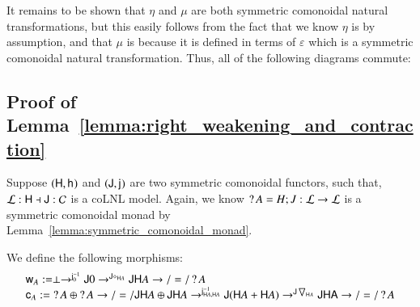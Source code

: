 It remains to be shown that $\eta$ and $\mu$ are both
symmetric comonoidal natural transformations, but this easily follows
from the fact that we know $\eta$ is by assumption, and that $\mu$
is because it is defined in terms of $\varepsilon$ which is a
symmetric comonoidal natural transformation.  Thus, all of the
following diagrams commute:

\subsection{Proof of Lemma~\ref{lemma:right_weakening_and_contraction}}
\label{subsec:proof_of_lemma:right_weakening_and_contraction}
Suppose $(\mathsf{H},\mathsf{h}_{})$ and $(\mathsf{J},\mathsf{j}_{})$ are two symmetric
comonoidal functors, such that, $\mathcal{L} : \mathsf{H} \dashv \mathsf{J}
: \mathcal{C}$ is a coLNL model.  Again, we know $\mathop{?} A = H;J : \mathcal{L}
\rightarrow \mathcal{L}$ is a symmetric comonoidal monad by
Lemma~\ref{lemma:symmetric_comonoidal_monad}.  

We define the following morphisms:
\[
\begin{array}{lll}
  \mathsf{w}_{A} := \perp \rightarrow^{\mathsf{j}^{-1}_{0}} \mathsf{J} 0 \rightarrow^{\mathsf{J}\diamond_{\mathsf{H} A}} \mathsf{JH}A \rightarrow/=/ \mathop{?} A\\
  \mathsf{c}_{A} := \mathop{?} A \oplus \mathop{?} A \rightarrow/=/ \mathsf{JH}A \oplus \mathsf{JH}A \rightarrow^{\mathsf{j}^{-1}_{\mathsf{H}A,\mathsf{H}A}} \mathsf{J}(\mathsf{H}A + \mathsf{H}A) \rightarrow^{\mathsf{J}\bigtriangledown_{\mathsf{H}A}} \mathsf{JHA} \rightarrow/=/ \mathop{?} A
\end{array}
\]

